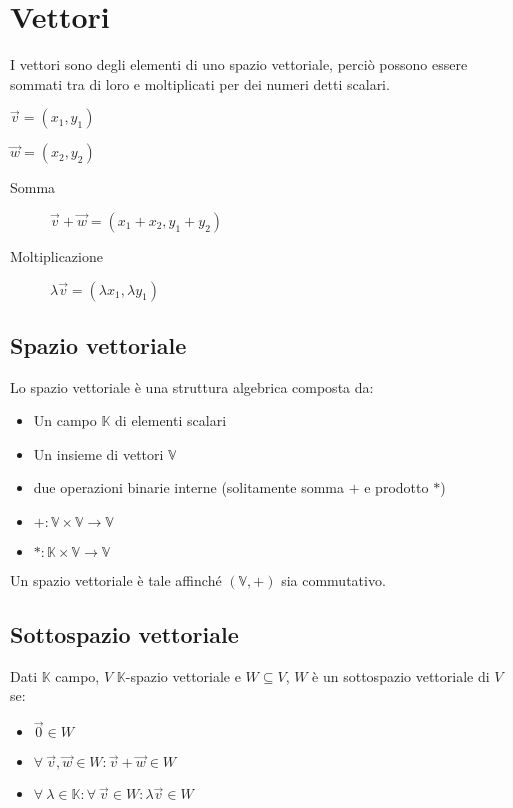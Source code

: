 \documentclass{article}
\begin{document}
\section{Vettori}

I vettori sono degli elementi di uno spazio vettoriale, perciò possono essere sommati tra di loro e moltiplicati per dei numeri detti scalari.

\begin{description}
    \item $\vec{v} = (x_1, y_1)$
    \item $\vec{w} = (x_2, y_2)$
\end{description}

\begin{description}
    \item[Somma] $\vec{v} + \vec{w} = (x_1 + x_2, y_1 + y_2)$
    \item[Moltiplicazione] $\lambda \vec{v} = (\lambda x_1, \lambda y_1)$
\end{description}

\subsection{Spazio vettoriale}

Lo spazio vettoriale è una struttura algebrica composta da:

\begin{itemize}
\item Un campo $\mathbb{K}$ di elementi scalari
\item Un insieme di vettori $\mathbb{V}$
\item due operazioni binarie interne (solitamente somma $+$ e prodotto $*$)
    \item $+: \mathbb{V} \times \mathbb{V} \to \mathbb{V}$
    \item $*: \mathbb{K} \times \mathbb{V} \to \mathbb{V}$
\end{itemize}

\noindent
Un spazio vettoriale è tale affinché $(\mathbb{V}, +)$ sia commutativo.

\subsection{Sottospazio vettoriale}

Dati $\mathbb{K}$ campo, $V$ $\mathbb{K}$-spazio vettoriale e $W \subseteq V$, $W$ è un sottospazio vettoriale di $V$ se:

\begin{itemize}
    \item $\vec{0} \in W$
    \item $\forall \ \vec{v}, \vec{w} \in W : \vec{v} + \vec{w} \in W$
    \item $\forall \ \lambda \in \mathbb{K} : \forall \ \vec{v} \in W : \lambda \vec{v} \in W$
\end{itemize}
\end{document}
